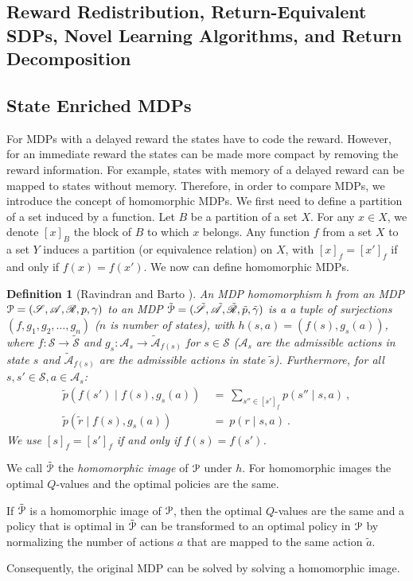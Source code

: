 \documentclass{article}
\newtheorem{definitionA}{Definition}
\newcommand{\sA}{\mathscr{A}} \newcommand{\sB}{\mathscr{B}}
\newcommand{\sS}{\mathscr{S}} \newcommand{\sT}{\mathscr{T}}
\begin{document}
\begin{appendices}
\section{Reward Redistribution, Return-Equivalent SDPs, Novel Learning Algorithms, 
         and Return Decomposition}
\label{c:RR}

\subsection{State Enriched MDPs}
\label{sec:AStateEnriched}

For MDPs with a delayed reward the
states have to code the reward. 
However, for an immediate reward the
states can be made more compact by removing the reward information.
For example, states with memory of a delayed reward can be mapped
to states without memory.
Therefore, in order to compare MDPs, we introduce the concept of homomorphic MDPs.
We first need to define a partition of a set induced by a function.
Let $B$ be a partition of a set $X$. For any $x \in X$,
we denote $[x]_B$ the block of $B$ to which $x$ belongs. 
Any function $f$ from a set $X$ to a set $Y$ 
induces a partition (or equivalence relation) on $X$, 
with $[x]_f = [x']_f$ if and only if $f(x) = f(x')$.
We now can define homomorphic MDPs.
\begin{definitionA}[Ravindran and Barto \cite{Ravindran:01,Ravindran:03}]
An MDP homomorphism $h$ from
an MDP $\cP=(\sS,\sA,\sR,p,\gamma)$
to an MDP
$\tilde{\cP}=(\tilde{\sS},\tilde{\sA},\tilde{\sR},\tilde{p},\tilde{\gamma})$
is a a tuple of surjections $(f,g_1,g_2,\ldots,g_n)$ ($n$ is number of
states), with $h(s,a)=(f(s),g_s(a))$,
where $f: \sS \to \tilde{\sS}$ and $g_s: \sA_s \to
\tilde{\sA}_{f(s)}$ for $s \in \sS$ ($\sA_s$ are the admissible actions in state $s$
and $\tilde{\sA}_{f(s)}$ are the admissible actions in state $\tilde{s}$).
Furthermore, for all $s,s' \in \sS, a \in \sA_s$:
\begin{align}
\tilde{p}(f(s') \mid f(s),g_s(a)) \ &= \ \sum_{s'' \in [s']_f} p(s''
\mid s,a) \ , \\
\tilde{p}(\tilde{r} \mid f(s),g_s(a)) \ &= \ p(r \mid s,a) \ .
\end{align}
We use $[s]_f=[s']_f$ if and only if $f(s)=f(s')$.
\end{definitionA}

We call
$\tilde{\mathcal{P}}$ the {\em homomorphic image} of $\mathcal{P}$ under $h$.
For homomorphic images the optimal $Q$-values and the optimal 
policies are the same. 
\begin{lemmaA}
\label{th:Arav}
If $\tilde{\mathcal{P}}$ is a homomorphic image of $\mathcal{P}$, then
the optimal $Q$-values are the same and
a policy that is optimal in $\tilde{\mathcal{P}}$ can be transformed to
an optimal policy in $\mathcal{P}$ by normalizing the number of actions $a$
that are mapped to the same action $\tilde{a}$.
\end{lemmaA}
Consequently, the original MDP
can be solved by solving a homomorphic image.


\end{appendices}
\end{document}
